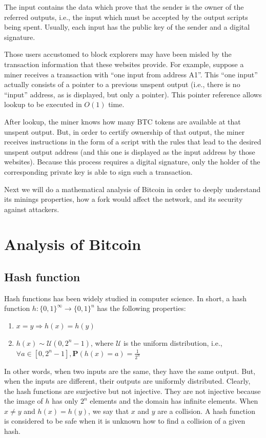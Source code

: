 The input contains the data which prove that the sender is the owner of the referred outputs, i.e., the input which must be accepted by the output scripts being spent. Usually, each input has the public key of the sender and a digital signature.

Those users accustomed to block explorers may have been misled by the transaction information that these websites provide.  For example, suppose a miner receives a transaction with ``one input from address A1''.  This ``one input'' actually consists of a pointer to a previous unspent output (i.e., there is no ``input'' address, as is displayed, but only a pointer). This pointer reference allows lookup to be executed in $O(1)$ time.

After lookup, the miner knows how many BTC tokens are available at that unspent output.  But, in order to certify ownership of that output, the miner receives instructions in the form of a script with the rules that lead to the desired unspent output address (and this one is displayed as the input address by those websites). Because this process requires a digital signature, only the holder of the corresponding private key is able to sign such a transaction.

Next we will do a mathematical analysis of Bitcoin in order to deeply understand its minings properties, how a fork would affect the network, and its security against attackers.

\chapter{Analysis of Bitcoin}

\section{Hash function}

Hash functions has been widely studied in computer science. In short, a hash function $h: \{0, 1\}^\infty \rightarrow \{0, 1\}^{n}$ has the following properties:

\begin{enumerate}
	\item $x = y \Rightarrow h(x) = h(y)$
	\item $h(x) \sim \mathcal{U}(0, 2^{n}-1)$, where $\mathcal{U}$ is the uniform distribution, i.e., $\forall a \in [0, 2^{n}-1], \mathbf{P}(h(x)=a) = \frac{1}{2^{n}}$
\end{enumerate}

In other words, when two inputs are the same, they have the same output. But, when the inputs are different, their outputs are uniformly distributed. Clearly, the hash functions are surjective but not injective. They are not injective because the image of $h$ has only $2^n$ elements and the domain has infinite elements. When $x \ne y$ and $h(x) = h(y)$, we say that $x$ and $y$ are a collision. A hash function is considered to be safe when it is unknown how to find a collision of a given hash.

